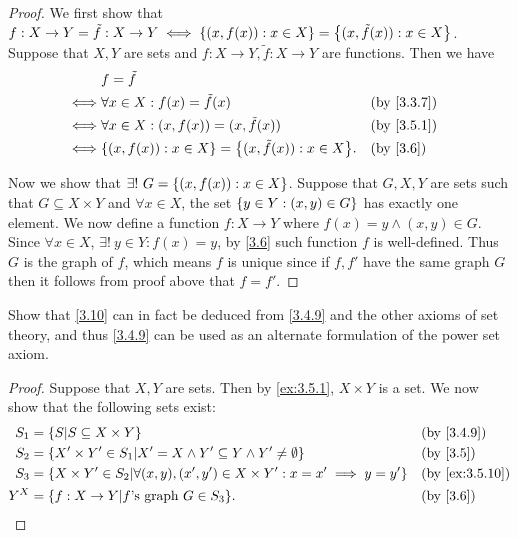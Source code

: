 \begin{proof}
	We first show that \(f : X \to Y = \tilde{f} : X \to Y \iff \left\lbrace(x, f(x)) : x \in X\right\rbrace = \left\lbrace(x, \tilde{f}(x)) : x \in X\right\rbrace\).
	Suppose that \(X, Y\) are sets and \(f : X \to Y, \tilde{f} : X \to Y\) are functions.
	Then we have
	\begin{align*}
		     & f = \tilde{f}                                                                  \\
		\iff & \forall x \in X : f(x) = \tilde{f}(x)                          &  & \by{3.3.7} \\
		\iff & \forall x \in X : (x, f(x)) = (x, \tilde{f}(x))                &  & \by{3.5.1} \\
		\iff & \set{(x, f(x)) : x \in X} = \set{(x, \tilde{f}(x)) : x \in X}. &  & \by{3.6}
	\end{align*}

	Now we show that \(\exists!\ G = \left\lbrace(x, f(x)) : x \in X\right\rbrace\).
	Suppose that \(G, X, Y\) are sets such that \(G \subseteq X \times Y\) and \(\forall x \in X\), the set \(\left\lbrace y \in Y : (x, y) \in G\right\rbrace\) has exactly one element.
	We now define a function \(f : X \to Y\) where \(f(x) = y \land (x, y) \in G\).
	Since \(\forall x \in X\), \(\exists!\ y \in Y : f(x) = y\), by \cref{3.6} such function \(f\) is well-defined.
	Thus \(G\) is the graph of \(f\), which means \(f\) is unique since if \(f, f'\) have the same graph \(G\) then it follows from proof above that \(f = f'\).
\end{proof}

\begin{ex}\label{ex:3.5.11}
	Show that \cref{3.10} can in fact be deduced from \cref{3.4.9} and the other axioms of set theory, and thus \cref{3.4.9} can be used as an alternate formulation of the power set axiom.
\end{ex}

\begin{proof}
	Suppose that \(X, Y\) are sets.
	Then by \cref{ex:3.5.1}, \(X \times Y\) is a set.
	We now show that the following sets exist:
	\begin{align*}
		S_1 & = \set{S | S \subseteq X \times Y}                                                              &  & \by{3.4.9}     \\
		S_2 & = \set{X' \times Y' \in S_1 | X' = X \land Y' \subseteq Y \land Y' \neq \emptyset}              &  & \by{3.5}       \\
		S_3 & = \set{X \times Y' \in S_2 | \forall (x, y), (x', y') \in X \times Y' : x = x' \implies y = y'} &  & \by{ex:3.5.10} \\
		Y^X & = \set{f : X \to Y | f \text{'s graph } G \in S_3}.                                             &  & \by{3.6}
	\end{align*}
\end{proof}

